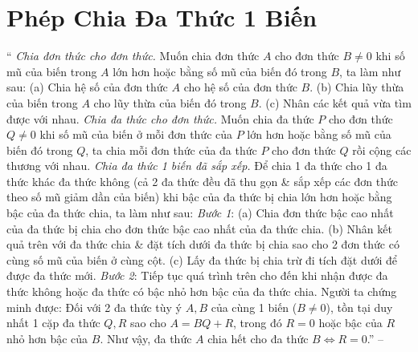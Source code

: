 \documentclass{article}
\begin{document}
\section{Phép Chia Đa Thức 1 Biến}
`` \textit{Chia đơn thức cho đơn thức.} Muốn chia đơn thức $A$ cho đơn thức $B\ne0$ khi số mũ của biến trong $A$ lớn hơn hoặc bằng số mũ của biến đó trong $B$, ta làm như sau: (a) Chia hệ số của đơn thức $A$ cho hệ số của đơn thức $B$. (b) Chia lũy thừa của biến trong $A$ cho lũy thừa của biến đó trong $B$. (c) Nhân các kết quả vừa tìm được với nhau.  \textit{Chia đa thức cho đơn thức.} Muốn chia đa thức $P$ cho đơn thức $Q\ne0$ khi số mũ của biến ở mỗi đơn thức của $P$ lớn hơn hoặc bằng số mũ của biến đó trong $Q$, ta chia mỗi đơn thức của đa thức $P$ cho đơn thức $Q$ rồi cộng các thương với nhau.  \textit{Chia đa thức 1 biến đã sắp xếp.} Để chia 1 đa thức cho 1 đa thức khác đa thức không (cả 2 đa thức đều đã thu gọn \& sắp xếp các đơn thức theo số mũ giảm dần của biến) khi bậc của đa thức bị chia lớn hơn hoặc bằng bậc của đa thức chia, ta làm như sau: \textit{Bước 1}: (a) Chia đơn thức bậc cao nhất của đa thức bị chia cho đơn thức bậc cao nhất của đa thức chia. (b) Nhân kết quả trên với đa thức chia \& đặt tích dưới đa thức bị chia sao cho 2 đơn thức có cùng số mũ của biến ở cùng cột. (c) Lấy đa thức bị chia trừ đi tích đặt dưới để được đa thức mới. \textit{Bước 2}: Tiếp tục quá trình trên cho đến khi nhận được đa thức không hoặc đa thức có bậc nhỏ hơn bậc của đa thức chia.  Người ta chứng minh được: Đối với 2 đa thức tùy ý $A,B$ của cùng 1 biến ($B\ne0$), tồn tại duy nhất 1 cặp đa thức $Q,R$ sao cho $A = BQ + R$, trong đó $R = 0$ hoặc bậc của $R$ nhỏ hơn bậc của $B$. Như vậy, đa thức $A$ chia hết cho đa thức $B\Leftrightarrow R = 0$.'' -- \cite[Chap. VI, \S5, pp. 51--52]{SBT_Toan_7_Canh_Dieu_tap_2}
\end{document}
